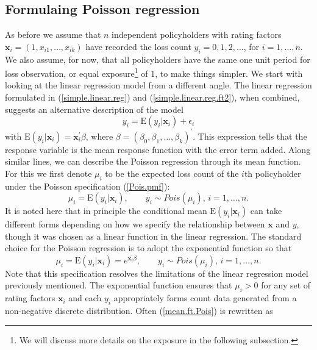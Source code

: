 \documentclass[12pt]{article}
\def\E{\mathrm{E}}
\begin{document}
\subsection{Formulaing Poisson regression}
As before we assume that $n$ independent policyholders with rating factors $\mathbf{ x}_i=(1, x_{i1}, \ldots, x_{ik})$ have recorded the loss count $y_i=0,1,2, \ldots $, for $i=1, \ldots, n$. We also assume, for now, that all policyholders have the same one unit period for loss observation, or equal exposure\footnote{We will discuss more details on the exposure in the following subsection.} of 1, to make things simpler. 
We start with looking at the linear regression model from a different angle. The linear regression formulated in (\ref{simple.linear.reg}) and  (\ref{simple.linear.reg.ft2}), when combined,  suggests an alternative description of the model
\begin{equation}
\label{ }
y_i= \E(y_i|\mathbf{ x}_i)+\epsilon_i
\end{equation} with $\E(y_i|\mathbf{ x}_i)=\mathbf{ x}^{\prime}_i\beta$, where $\beta=(\beta_0, \beta_1, \ldots, \beta_k)^{\prime}$. This expression tells that the response variable is the mean response function with the error term added. Along similar lines, we can describe the Poisson regression through its mean function. For this we first denote $\mu_i$ to be the expected loss count of the $i$th policyholder under the Poisson specification (\ref{Pois.pmf}): 
\begin{equation}
\label{ }
\mu_i=\E(y_i|\mathbf{ x}_i), \qquad y_i \sim Pois(\mu_i), \, i=1, \ldots, n.
\end{equation} 
It is noted here that in principle the conditional mean $\E(y_i|\mathbf{ x}_i)$ can take different forms depending on how we specify the relationship between $\mathbf{ x}$ and $y$, though it was chosen as a linear function in the linear regression. The standard choice for the Poisson regression is to adopt the exponential function so that
\begin{equation}
\label{mean.ft.Pois}
\mu_i=\E(y_i|\mathbf{ x}_i)=e^{\mathbf{ x}^{\prime}_i\beta}, \qquad y_i \sim Pois(\mu_i), \, i=1, \ldots, n.
\end{equation} 
Note that this specification resolves the limitations of the linear regression model previously mentioned. The exponential function ensures that $\mu_i >0$ for any set of rating factors $\mathbf{ x}_i$ and each $y_i$ appropriately forms count data generated from a non-negative discrete distribution.
Often (\ref{mean.ft.Pois}) is rewritten as
\end{document}
